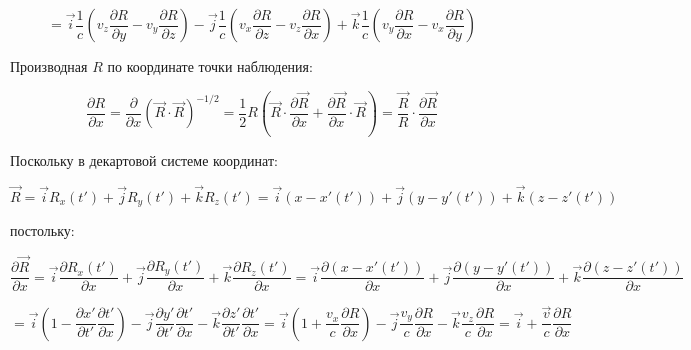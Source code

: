 \documentclass[12pt, a4paper]{article}
\begin{document}
\begin{equation}
= \vec{i} \frac{1}{c} \left( v_z \frac{\partial R}{\partial y} - v_y \frac{\partial R}{\partial z} \right) - \vec{j} \frac{1}{c} \left( v_x \frac{\partial R}{\partial z} - v_z \frac{\partial R}{\partial x} \right) + \vec{k} \frac{1}{c} \left( v_y \frac{\partial R}{\partial x} - v_x \frac{\partial R}{\partial y} \right)
\label{eq:rot_R_final}
\end{equation}

Производная $R$ по координате точки наблюдения:

\begin{equation}
\frac{\partial R}{\partial x} = \frac{\partial}{\partial x} (\vec{R} \cdot \vec{R})^{-1/2} = \frac{1}{2} R (\vec{R} \cdot \frac{\partial \vec{R}}{\partial x} + \frac{\partial \vec{R}}{\partial x} \cdot \vec{R}) = \frac{\vec{R}}{R} \cdot \frac{\partial \vec{R}}{\partial x}
\label{eq:dR_dx}
\end{equation}

Поскольку в декартовой системе координат:

\begin{equation}
\vec{R} = \vec{i} R_x(t') + \vec{j} R_y(t') + \vec{k} R_z(t') = \vec{i} (x - x'(t')) + \vec{j} (y - y'(t')) + \vec{k} (z - z'(t'))
\label{eq:R_cartesian}
\end{equation}

постольку:

\begin{equation}
\frac{\partial \vec{R}}{\partial x} = \vec{i} \frac{\partial R_x(t')}{\partial x} + \vec{j} \frac{\partial R_y(t')}{\partial x} + \vec{k} \frac{\partial R_z(t')}{\partial x} = \vec{i} \frac{\partial (x - x'(t'))}{\partial x} + \vec{j} \frac{\partial (y - y'(t'))}{\partial x} + \vec{k} \frac{\partial (z - z'(t'))}{\partial x}
\label{eq:dR_dx_expanded}
\end{equation}

\begin{equation}
= \vec{i} \left( 1 - \frac{\partial x'}{\partial t'} \frac{\partial t'}{\partial x} \right) - \vec{j} \frac{\partial y'}{\partial t'} \frac{\partial t'}{\partial x} - \vec{k} \frac{\partial z'}{\partial t'} \frac{\partial t'}{\partial x} = \vec{i} \left( 1 + \frac{v_x}{c} \frac{\partial R}{\partial x} \right) - \vec{j} \frac{v_y}{c} \frac{\partial R}{\partial x} - \vec{k} \frac{v_z}{c} \frac{\partial R}{\partial x} = \vec{i} + \frac{\vec{v}}{c} \frac{\partial R}{\partial x}
\label{eq:dR_dx_final}
\end{equation}
\end{document}
